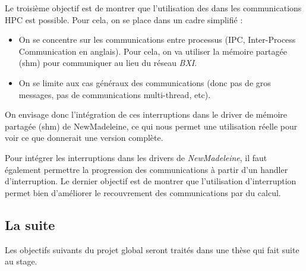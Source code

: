 Le troisième objectif est de montrer que l'utilisation des \uintr{} dans les communications HPC est possible.
Pour cela, on se place dans un cadre simplifié :

\begin{itemize}
  \item On se concentre sur les communications entre processus (IPC, Inter-Process Communication en anglais).
  Pour cela, on va utiliser la mémoire partagée (shm) pour communiquer au lieu du réseau \emph{BXI}.
  \item On se limite aux cas généraux des communications (donc pas de gros messages, pas de communications multi-thread, etc).
\end{itemize}

On envisage donc l'intégration de ces interruptions dans le driver de mémoire partagée (shm) de NewMadeleine,
ce qui nous permet une utilisation réelle pour voir ce que donnerait une version complète.

Pour intégrer les interruptions dans les drivers de \emph{NewMadeleine}, il faut également permettre la progression des communications à partir d'un handler d'interruption.
Le dernier objectif est de montrer que l'utilisation d'interruption permet bien d'améliorer le recouvrement des communications par du calcul.

\subsection{La suite}

Les objectifs suivants du projet global seront traités dans une thèse qui fait suite au stage.
